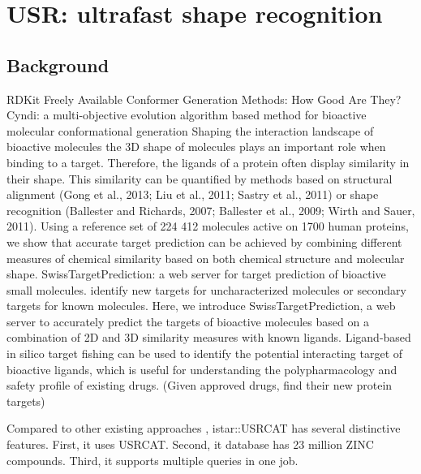 \chapter{USR: ultrafast shape recognition}

\section{Background}

RDKit
\citep{1127} Freely Available Conformer Generation Methods: How Good Are They?
\citep{1393,1394} Cyndi: a multi-objective evolution algorithm based method for bioactive molecular conformational generation
\citep{1407} Shaping the interaction landscape of bioactive molecules
\citep{1407} the 3D shape of molecules plays an important role when binding to a target. Therefore, the ligands of a protein often display similarity in their shape. This similarity can be quantified by methods based on structural alignment (Gong et al., 2013; Liu et al., 2011; Sastry et al., 2011) or shape recognition (Ballester and Richards, 2007; Ballester et al., 2009; Wirth and Sauer, 2011).
\citep{1407} Using a reference set of 224 412 molecules active on 1700 human proteins, we show that accurate target prediction can be achieved by combining different measures of chemical similarity based on both chemical structure and molecular shape.
\citep{1408} SwissTargetPrediction: a web server for target prediction of bioactive small molecules. identify new targets for uncharacterized molecules or secondary targets for known molecules. Here, we introduce SwissTargetPrediction, a web server to accurately predict the targets of bioactive molecules based on a combination of 2D and 3D similarity measures with known ligands.
\citep{1402} Ligand-based in silico target fishing can be used to identify the potential interacting target of bioactive ligands, which is useful for understanding the polypharmacology and safety profile of existing drugs. (Given approved drugs, find their new protein targets)

Compared to other existing approaches \citep{1333,1334,1335,1337,1338,1331}, istar::USRCAT has several distinctive features. First, it uses USRCAT. Second, it database has 23 million ZINC compounds. Third, it supports multiple queries in one job.

\chapterend
